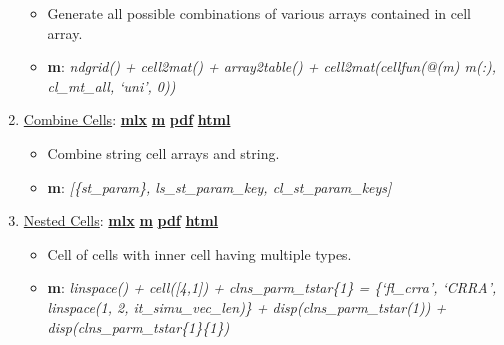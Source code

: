\documentclass[
]{book}
\providecommand{\tightlist}{%
  \setlength{\itemsep}{0pt}\setlength{\parskip}{0pt}}
\begin{document}
\begin{enumerate}
  \begin{itemize}
  \tightlist
  \item
    Generate all possible combinations of various arrays contained in cell array.
  \item
    \textbf{m}: \emph{ndgrid() + cell2mat() + array2table() + cell2mat(cellfun(@(m) m(:), cl\_mt\_all, `uni', 0))}
  \end{itemize}
\item
  \href{https://fanwangecon.github.io/M4Econ/amto/cell/htmlpdfm/fs_cellscombine.html}{Combine Cells}: \href{https://github.com/FanWangEcon/M4Econ/blob/master/amto/cell/fs_cellscombine.mlx}{\textbf{mlx}} \textbar{} \href{https://github.com/FanWangEcon/M4Econ/blob/master/amto/cell/htmlpdfm/fs_cellscombine.m}{\textbf{m}} \textbar{} \href{https://github.com/FanWangEcon/M4Econ/blob/master/amto/cell/htmlpdfm/fs_cellscombine.pdf}{\textbf{pdf}} \textbar{} \href{https://fanwangecon.github.io/M4Econ/amto/cell/htmlpdfm/fs_cellscombine.html}{\textbf{html}}

  \begin{itemize}
  \tightlist
  \item
    Combine string cell arrays and string.
  \item
    \textbf{m}: \emph{{[}\{st\_param\}, ls\_st\_param\_key, cl\_st\_param\_keys{]}}
  \end{itemize}
\item
  \href{https://fanwangecon.github.io/M4Econ/amto/cell/htmlpdfm/fs_cellsnested.html}{Nested Cells}: \href{https://github.com/FanWangEcon/M4Econ/blob/master/amto/cell/fs_cellsnested.mlx}{\textbf{mlx}} \textbar{} \href{https://github.com/FanWangEcon/M4Econ/blob/master/amto/cell/htmlpdfm/fs_cellsnested.m}{\textbf{m}} \textbar{} \href{https://github.com/FanWangEcon/M4Econ/blob/master/amto/cell/htmlpdfm/fs_cellsnested.pdf}{\textbf{pdf}} \textbar{} \href{https://fanwangecon.github.io/M4Econ/amto/cell/htmlpdfm/fs_cellsnested.html}{\textbf{html}}

  \begin{itemize}
  \tightlist
  \item
    Cell of cells with inner cell having multiple types.
  \item
    \textbf{m}: \emph{linspace() + cell({[}4,1{]}) + clns\_parm\_tstar\{1\} = \{`fl\_crra', `CRRA', linspace(1, 2, it\_simu\_vec\_len)\} + disp(clns\_parm\_tstar(1)) + disp(clns\_parm\_tstar\{1\}\{1\})}
  \end{itemize}
\end{enumerate}
\end{document}
